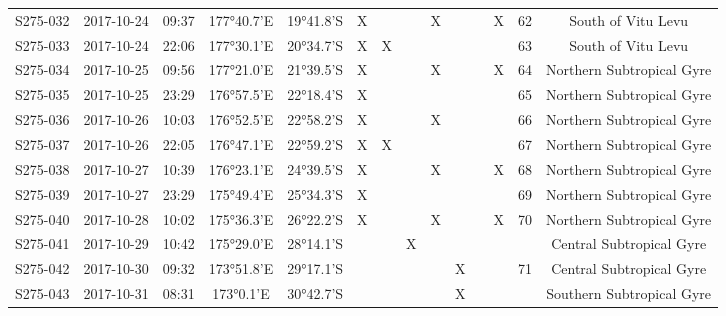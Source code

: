 \begin{longtable}{cccccccccccccc}
  S275-032 & 2017-10-24 & 09:37 & 177°40.7'E & 19°41.8'S & X &  &  & X &  &  & X & 62 & South of Vitu Levu \\ 
  S275-033 & 2017-10-24 & 22:06 & 177°30.1'E & 20°34.7'S & X & X &  &  &  &  &  & 63 & South of Vitu Levu \\ 
  S275-034 & 2017-10-25 & 09:56 & 177°21.0'E & 21°39.5'S & X &  &  & X &  &  & X & 64 & Northern Subtropical Gyre \\ 
  S275-035 & 2017-10-25 & 23:29 & 176°57.5'E & 22°18.4'S & X &  &  &  &  &  &  & 65 & Northern Subtropical Gyre \\ 
  S275-036 & 2017-10-26 & 10:03 & 176°52.5'E & 22°58.2'S & X &  &  & X &  &  &  & 66 & Northern Subtropical Gyre \\ 
  S275-037 & 2017-10-26 & 22:05 & 176°47.1'E & 22°59.2'S & X & X &  &  &  &  &  & 67 & Northern Subtropical Gyre \\ 
  S275-038 & 2017-10-27 & 10:39 & 176°23.1'E & 24°39.5'S & X &  &  & X &  &  & X & 68 & Northern Subtropical Gyre \\ 
  S275-039 & 2017-10-27 & 23:29 & 175°49.4'E & 25°34.3'S & X &  &  &  &  &  &  & 69 & Northern Subtropical Gyre \\ 
  S275-040 & 2017-10-28 & 10:02 & 175°36.3'E & 26°22.2'S & X &  &  & X &  &  & X & 70 & Northern Subtropical Gyre \\ 
  S275-041 & 2017-10-29 & 10:42 & 175°29.0'E & 28°14.1'S &  &  & X &  &  &  &  &  & Central Subtropical Gyre \\ 
  S275-042 & 2017-10-30 & 09:32 & 173°51.8'E & 29°17.1'S &  &  &  &  & X &  &  & 71 & Central Subtropical Gyre \\ 
  S275-043 & 2017-10-31 & 08:31 & 173°0.1'E & 30°42.7'S &  &  &  &  & X &  &  &  & Southern Subtropical Gyre \\ 
  \hline
\end{longtable}

